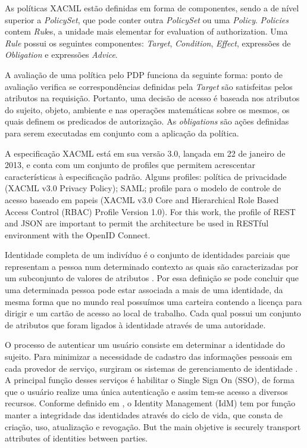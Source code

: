 \documentclass{doublecol-new}
\begin{document}
As políticas XACML estão definidas em forma de componentes, sendo a de nível superior a \textit{PolicySet}, que pode conter outra \textit{PolicySet} ou uma \textit{Policy}. \textit{Policies} contem \textit{Rul}es, a unidade mais elementar for evaluation of authorization. Uma \textit{Rule} possui os seguintes componentes: \textit{Target}, \textit{Condition}, \textit{Effect}, expressões de \textit{Obligation} e expressões \textit{Advice}.
	
A avaliação de uma política pelo PDP funciona da seguinte forma: ponto de avaliação verifica se correspondências definidas pela \textit{Target} são satisfeitas pelos atributos na requisição. Portanto, uma decisão de acesso é baseada nos atributos do sujeito, objeto, ambiente e nas operações matemáticas sobre os mesmos, os quais definem os predicados de autorização. As \textit{obligations} são ações definidas para serem executadas em conjunto com a aplicação da política.
	
A especificação XACML está em sua versão 3.0, lançada em 22 de janeiro de 2013, e conta com um conjunto de profiles que permitem acrescentar características à especificação padrão. Alguns profiles: política de privacidade (XACML v3.0 Privacy Policy); SAML; profile para o modelo de controle de acesso baseado em papeis (XACML v3.0 Core and Hierarchical Role Based Access Control (RBAC) Profile Version 1.0). For this work, the profile of REST and JSON are important to permit the architecture be used in RESTful environment with the OpenID Connect.
	
Identidade completa de um indivíduo é o conjunto de identidades parciais que representam a pessoa num determinado contexto as quais são caracterizadas por um subconjunto de valores de atributos \cite{pfitzmann2010terminology}. Por essa definição se pode concluir que uma determinada pessoa pode estar associada a mais de uma identidade, da mesma forma que no mundo real possuímos uma carteira contendo a licença para dirigir e um cartão de acesso ao local de trabalho. Cada qual possui um conjunto de atributos que foram ligados à identidade através de uma autoridade.

	
O processo de autenticar um usuário consiste em determinar a identidade do sujeito. Para minimizar a necessidade de cadastro das informações pessoais em cada provedor de serviço, surgiram os sistemas de gerenciamento de identidade \cite{el2007survey} \cite{cao2010survey}. A principal função desses serviços é habilitar o Single Sign On (SSO), de forma que o usuário realize uma única autenticação e assim tem-se acesso a diversos recursos. Conforme definido em \cite{bertino2011identity}, o Identity Management (IdM) tem por função manter a integridade das identidades através do ciclo de vida, que consta de criação, uso, atualização e revogação. But the main objetive is securely transport attributes of identities between parties.
\end{document}

